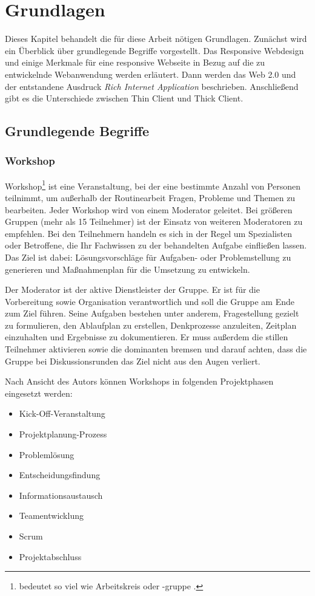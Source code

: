 \chapter{Grundlagen}
\label{sec:grundlagen}
Dieses Kapitel behandelt die für diese Arbeit nötigen Grundlagen. Zunächst wird ein Überblick über grundlegende Begriffe vorgestellt. Das Responsive Webdesign und einige Merkmale für eine responsive Webseite in Bezug auf die zu entwickelnde Webanwendung werden erläutert. Dann werden das Web 2.0 und der entstandene Ausdruck \textit{Rich Internet Application} beschrieben. Anschließend gibt es die Unterschiede zwischen Thin Client und Thick Client.

\section{Grundlegende Begriffe}
\label{sec:grundlegende begriffe}

\subsection{Workshop}
\label{sec:workshop}
Workshop\footnote{bedeutet so viel wie \glqq Arbeitskreis oder -gruppe\grqq{} .} ist eine Veranstaltung, bei der eine bestimmte Anzahl von Personen teilnimmt, um außerhalb der Routinearbeit Fragen, Probleme und Themen zu bearbeiten. Jeder Workshop wird von einem Moderator geleitet. Bei größeren Gruppen (mehr als 15 Teilnehmer) ist der Einsatz von weiteren Moderatoren zu empfehlen. Bei den Teilnehmern handeln es sich in der Regel um Spezialisten oder Betroffene, die Ihr Fachwissen zu der behandelten Aufgabe einfließen lassen. Das Ziel ist dabei: Lösungsvorschläge für Aufgaben- oder Problemstellung zu generieren und Maßnahmenplan für die Umsetzung zu entwickeln.\bigskip

Der Moderator ist der aktive Dienstleister der Gruppe. Er ist für die Vorbereitung sowie Organisation verantwortlich und soll die Gruppe am Ende zum Ziel führen. Seine Aufgaben bestehen unter anderem, Fragestellung gezielt zu formulieren, den Ablaufplan zu erstellen, Denkprozesse anzuleiten, Zeitplan einzuhalten und Ergebnisse zu dokumentieren. Er muss außerdem die stillen Teilnehmer aktivieren sowie die dominanten bremsen und darauf achten, dass die Gruppe bei Diskussionsrunden das Ziel nicht aus den Augen verliert.\bigskip

Nach Ansicht des Autors \cite{Boh2016} können Workshops in folgenden Projektphasen eingesetzt werden:

\begin{itemize} 
\item Kick-Off-Veranstaltung
\item Projektplanung-Prozess
\item Problemlösung
\item Entscheidungsfindung
\item Informationsaustausch
\item Teamentwicklung
\item Scrum
\item Projektabschluss
\end{itemize}

